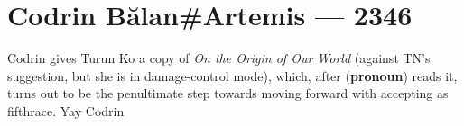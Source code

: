 \hypertarget{codrin-bux103lanartemis-2346}{%
\chapter{Codrin Bălan\#Artemis — 2346}\label{codrin-bux103lanartemis-2346}}

Codrin gives Turun Ko a copy of \emph{On the Origin of Our World} (against TN's suggestion, but she is in damage-control mode), which, after (\textbf{pronoun}) reads it, turns out to be the penultimate step towards moving forward with accepting as fifthrace. Yay Codrin
